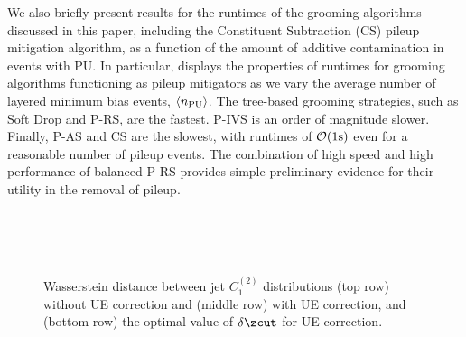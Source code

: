 We also briefly present results for the runtimes of the grooming algorithms discussed in this paper, including the Constituent Subtraction (CS) pileup mitigation algorithm, as a function of the amount of additive contamination in events with PU.
%
In particular,  displays the properties of runtimes for grooming algorithms functioning as pileup mitigators as we vary the average number of layered minimum bias events, \(\langle n_{\rm PU} \rangle\).
%
The tree-based grooming strategies, such as Soft Drop and P-RS, are the fastest.
%
P-IVS is an order of magnitude slower.
%
Finally, P-AS and CS are the slowest, with runtimes of \(\mathcal O({\rm 1s})\) even for a reasonable number of pileup events.
%
The combination of high speed and high performance of balanced P-RS provides simple preliminary evidence for their utility in the removal of pileup.
\\~\\

\begin{figure}[p]
    \centering
    \\
    \\
\caption{
    Wasserstein distance between jet \(C_1^{(2)}\) distributions (top row) without UE correction and (middle row) with UE correction, and (bottom row) the optimal value of \(\delta \zcut\) for UE correction.
}
\label{fig:uefrenzy}
\end{figure}


